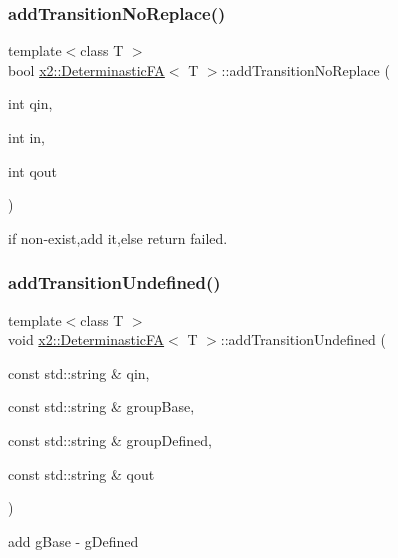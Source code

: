 \subsubsection{\texorpdfstring{add\+Transition\+No\+Replace()}{addTransitionNoReplace()}}
{\footnotesize\ttfamily template$<$class T $>$ \\
bool \hyperlink{classx2_1_1_determinastic_f_a}{x2\+::\+Determinastic\+FA}$<$ T $>$\+::add\+Transition\+No\+Replace (\begin{DoxyParamCaption}\item[{int}]{qin,  }\item[{int}]{in,  }\item[{int}]{qout }\end{DoxyParamCaption})}

if non-\/exist,add it,else return failed. \mbox{\label{classx2_1_1_determinastic_f_a_ab5efc90ac528b9d8383b993aa93b6ced}} 
\subsubsection{\texorpdfstring{add\+Transition\+Undefined()}{addTransitionUndefined()}}
{\footnotesize\ttfamily template$<$class T $>$ \\
void \hyperlink{classx2_1_1_determinastic_f_a}{x2\+::\+Determinastic\+FA}$<$ T $>$\+::add\+Transition\+Undefined (\begin{DoxyParamCaption}\item[{const std\+::string \&}]{qin,  }\item[{const std\+::string \&}]{group\+Base,  }\item[{const std\+::string \&}]{group\+Defined,  }\item[{const std\+::string \&}]{qout }\end{DoxyParamCaption})\hspace{0.3cm}{\ttfamily [inline]}}

add g\+Base -\/ g\+Defined \mbox{\label{classx2_1_1_determinastic_f_a_afd31af3cc87e3d372900fa62da926a69}} 
